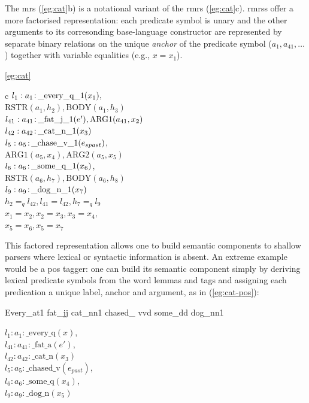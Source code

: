 The {\sc mrs} (\ref{eg:cat}b) is a notational variant of the {\sc
  rmrs} (\ref{eg:cat}c). {\sc rmrs}s offer a more factorised
representation: each predicate symbol is unary and the other
arguments to its corresonding base-language constructor
are represented by separate binary relations on the unique {\em
  anchor} of the predicate symbol ($a_1, a_{41},\ldots$) together with
variable equalities (e.g., $x=x_1$).
\begin{examples}
\item   [\ref{eg:cat}]
\begin{subexamples}
\item   [c]
$l_1:a_1\colon\!\mbox{\_every\_q\_1}(x_1),$\\
\hspace*{0.1in}$\mbox{RSTR}(a_1,h_2),
\mbox{BODY}(a_1,h_3)$\\ 
$l_{41}:a_{41}\colon\!\mbox{\_fat\_j\_1}(e'), \mbox{ARG1}(a_{41},x_2)$\\
$l_{42}:a_{42}\colon\!\mbox{\_cat\_n\_1}(x_3)$\\
$l_5:a_5\colon\!\mbox{\_chase\_v\_1}(e_{spast})$,\\
\hspace*{0.1in}$\mbox{ARG1}(a_5,x_4),
\mbox{ARG2}(a_5,x_5)$\\ 
$l_6:a_6\colon\!\mbox{\_some\_q\_1}(x_6)$,\\
\hspace*{0.1in}$\mbox{RSTR}(a_6,h_7),
\mbox{BODY}(a_6,h_8)$\\ 
$l_9:a_9\colon\!\mbox{\_dog\_n\_1}(x_7)$\\
$h_2=_q l_{42}, l_{41}=l_{42}, h_7 =_q l_9$\\
$x_1=x_2, x_2=x_3, x_3=x_4,$\\
$x_5=x_6, x_5=x_7$
\end{subexamples}
\end{examples}

This factored representation allows one to build semantic components
to shallow parsers where lexical or syntactic information is absent.
An extreme example would be a {\sc 
  pos} tagger: one can build its semantic component simply by deriving
lexical predicate symbols from the word lemmas and tags and assigning each
predication a unique label, anchor and
argument, as in (\ref{eg:cat-pos}):
\begin{examples}
\item   \label{eg:cat-pos}
\begin{subexamples}
\item   Every\_{\sc at1} fat\_{\sc jj} cat\_{\sc nn1} chased\_{\sc
    vvd} some\_{\sc dd} dog\_{\sc nn1}
\item   $l_1:a_1:\mbox{\_every\_q}(x)$, \\
$l_{41}:a_{41}:\mbox{\_fat\_a}(e')$,\\
$l_{42}:a_{42}:\mbox{\_cat\_n}(x_3)$\\
$l_5:a_5:\mbox{\_chased\_v}(e_{past})$, \\
$l_6:a_6:\mbox{\_some\_q}(x_4)$, \\
$l_9:a_9:\mbox{\_dog\_n}(x_5)$
\end{subexamples}
\end{examples}

